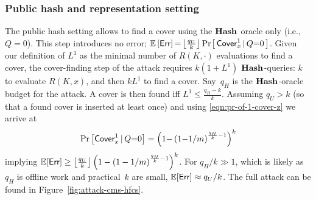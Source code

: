 \subsubsection{Public hash and representation setting}
The public hash setting allows to find a cover using the $\textup{\textbf{Hash}}\hspace{0.5pt}$ oracle only  (i.e., $Q{=}0$).
This step introduces no error;
$\mathbb{E}\left[\mathsf{Err}\right]{=}\allowbreak \left\lfloor\frac{q_U}{k}\right\rfloor \Pr\hspace{-1pt}\left[\,\mathsf{Cover}^{1}_{x} \,|\, Q{=}0\,\right]$.
Given our definition of $L^1$ as the minimal number of $R(K,{\cdot})$ evaluations to find a cover,
the cover-finding step of the attack requires $k(1{+}L^1)$ $\textup{\textbf{Hash}}\hspace{0.5pt}$-queries: $k$ to evaluate $R(K,x)$, and then $kL^1$ to find a cover.
Say~$q_H$ is the $\textup{\textbf{Hash}}\hspace{0.5pt}$-oracle budget for the attack. A cover is then found iff $L^1{\leq}\frac{q_H{-}k}{k}$. 
Assuming $q_U > k$ (so that a found cover is inserted at least once) and using \eqref{eqn:pr-of-1-cover-z} we arrive at
\begin{align}\label{eqn:pub-pub-pr-cover-qH}
	\Pr\left[\mathsf{Cover}^{1}_{x} \,|\, Q{=}0\right] 
	= \left(1{-}\left(1{-}{1}/{m}\right)^{\frac{q_H}{k}{-}1}\right)^{k}
\end{align}
implying $\mathbb{E}[\mathsf{Err}] \geq \left\lfloor\frac{q_U}{k}\right\rfloor \left(1 - \left(1 - 1/m\right)^{\frac{q_H}{k}-1}\right)^{k}
$. For $q_H/k \gg 1$, which is likely as $q_H$ is offline work and practical~$k$ are small, $\mathbb{E}[\mathsf{Err}]\approx q_U/k$. 
The full attack can be found in Figure~\ref{fig:attack-cms-hfcs}.
